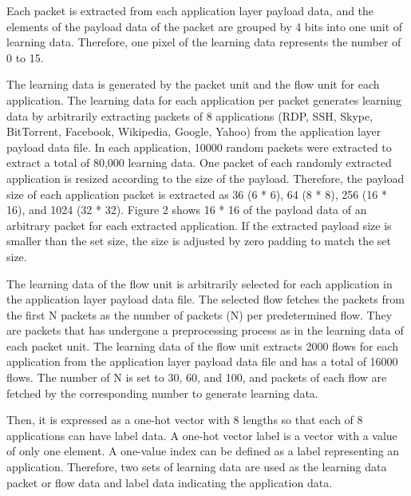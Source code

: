 Each packet is extracted from each application layer payload data, and the elements of the payload data of the packet are grouped by 4 bits into one unit of learning data.
Therefore, one pixel of the learning data represents the number of 0 to 15.

The learning data is generated by the packet unit and the flow unit for each application.
The learning data for each application per packet generates learning data by arbitrarily extracting packets of 8 applications (RDP, SSH, Skype, BitTorrent, Facebook, Wikipedia, Google, Yahoo) from the application layer payload data file.
In each application, 10000 random packets were extracted to extract a total of 80,000 learning data. One packet of each randomly extracted application is resized according to the size of the payload.
Therefore, the payload size of each application packet is extracted as 36 (6 * 6), 64 (8 * 8), 256 (16 * 16), and 1024 (32 * 32).
Figure 2 shows 16 * 16 of the payload data of an arbitrary packet for each extracted application.
If the extracted payload size is smaller than the set size, the size is adjusted by zero padding to match the set size.

The learning data of the flow unit is arbitrarily selected for each application in the application layer payload data file.
The selected flow fetches the packets from the first N packets as the number of packets (N) per predetermined flow.
They are  packets that has undergone a preprocessing process as in the learning data of each packet unit.
The learning data of the flow unit extracts 2000 flows for each application from the application layer payload data file and has a total of 16000 flows.
The number of N is set to 30, 60, and 100, and packets of each flow are fetched by the corresponding number to generate learning data.

Then, it is expressed as a one-hot vector with 8 lengths so that each of 8 applications can have label data.
A one-hot vector label is a vector with a value of only one element.
A one-value index can be defined as a label representing an application.
Therefore, two sets of learning data are used as the learning data packet or flow data and label data indicating the application data.